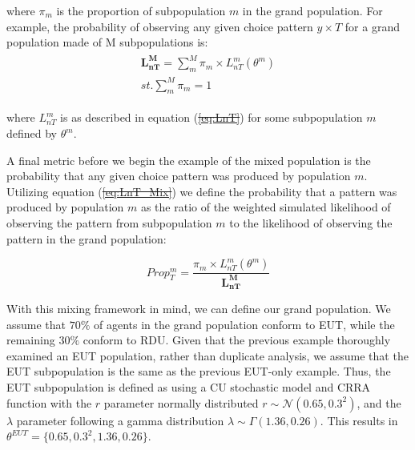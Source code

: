 \documentclass[11pt,a4paper]{report}
\providecommand{\DIFaddtex}[1]{{\protect\color{blue}\uwave{#1}}} %
\providecommand{\DIFdeltex}[1]{{\protect\color{red}\sout{#1}}}                      %
\providecommand{\DIFaddbegin}{} %
\providecommand{\DIFaddend}{} %
\providecommand{\DIFdelbegin}{} %
\providecommand{\DIFdelend}{} %
\providecommand{\DIFadd}[1]{\texorpdfstring{\DIFaddtex{#1}}{#1}} %
\providecommand{\DIFdel}[1]{\texorpdfstring{\DIFdeltex{#1}}{}} %
\newcommand{\DIFscaledelfig}{0.5}
\newlength{\DIFdelgraphicswidth} %
\newlength{\DIFdelgraphicsheight} %
\newcommand{\DIFaddincludegraphics}[2][]{{\color{blue}\fbox{\DIFOincludegraphics[#1]{#2}}}} %
\newcommand{\DIFdelincludegraphics}[2][]{%
\sbox{\DIFdelgraphicsbox}{\DIFOincludegraphics[#1]{#2}}%
\settoboxwidth{\DIFdelgraphicswidth}{\DIFdelgraphicsbox} %
\settoboxtotalheight{\DIFdelgraphicsheight}{\DIFdelgraphicsbox} %
\scalebox{\DIFscaledelfig}{%
\parbox[b]{\DIFdelgraphicswidth}{\usebox{\DIFdelgraphicsbox}\\[-\baselineskip] \rule{\DIFdelgraphicswidth}{0em}}\llap{\resizebox{\DIFdelgraphicswidth}{\DIFdelgraphicsheight}{%
\setlength{\unitlength}{\DIFdelgraphicswidth}%
\begin{picture}(1,1)%
\thicklines\linethickness{2pt} %
{\color[rgb]{1,0,0}\put(0,0){\framebox(1,1){}}}%
{\color[rgb]{1,0,0}\put(0,0){\line( 1,1){1}}}%
{\color[rgb]{1,0,0}\put(0,1){\line(1,-1){1}}}%
\end{picture}%
}\hspace*{3pt}}} %
} %
\DeclareRobustCommand{\DIFaddbegin}{\DIFOaddbegin \let\includegraphics\DIFaddincludegraphics} %
\DeclareRobustCommand{\DIFaddend}{\DIFOaddend \let\includegraphics\DIFOincludegraphics} %
\DeclareRobustCommand{\DIFdelbegin}{\DIFOdelbegin \let\includegraphics\DIFdelincludegraphics} %
\DeclareRobustCommand{\DIFdelend}{\DIFOaddend \let\includegraphics\DIFOincludegraphics} %
\begin{document}
\noindent where $\pi_m$ is the proportion of subpopulation $m$ in the grand population.
For example, the probability of observing any given choice pattern $y \times T$ for a grand population made of M subpopulations is:
\begin{align}
	\DIFdelbegin %
\DIFdelend \DIFaddbegin \label{eq3:LnT_Mix}
	\DIFaddend \begin{split}
		\bm{L_{nT}^M} = \sum_m^M \pi_m \times L_{nT}^m(\theta^m) \\ 
		\mathit{st.} \sum_m^M \pi_m = 1
	\end{split}
\end{align}

\noindent where $L_{nT}^m$ is as described in equation (\DIFdelbegin \DIFdel{\ref{eq:LnT}}\DIFdelend \DIFaddbegin \DIFadd{\ref{eq3:LnT}}\DIFaddend ) for some subpopulation $m$ defined by $\theta^m$.

A final metric before we begin the example of the mixed population is the probability that any given choice pattern was produced by population $m$.
Utilizing equation (\DIFdelbegin \DIFdel{\ref{eq:LnT_Mix}}\DIFdelend \DIFaddbegin \DIFadd{\ref{eq3:LnT_Mix}}\DIFaddend ) we define the probability that a pattern was produced by population $m$ as the ratio of the weighted simulated likelihood of observing the pattern from subpopulation $m$ to the likelihood of observing the pattern in the grand population:

\begin{equation}
	\DIFdelbegin %
\DIFdelend \DIFaddbegin \label{eq3:Propm}
	\DIFaddend \mathit{Prop^m_{T}} = \frac{\pi_m \times L_{nT}^m(\theta^m) }{\bm{L_{nT}^M}}
\end{equation}

With this mixing framework in mind, we can define our grand population.
We assume that $70\%$ of agents in the grand population conform to EUT, while the remaining $30\%$ conform to RDU.
Given that the previous example thoroughly examined an EUT population, rather than duplicate analysis, we assume that the EUT subpopulation is the same as the previous EUT-only example.
Thus, the EUT subpopulation is defined as using a CU stochastic model and CRRA function with the $r$ parameter normally distributed $r \sim \mathcal{N}(0.65 , 0.3^2 )$, and the $\lambda$ parameter following a gamma distribution $\lambda \sim \Gamma(1.36 , 0.26)$.
This results in $\theta^{EUT} = \lbrace 0.65 ,0.3^2, 1.36 , 0.26\rbrace$.
\end{document}
